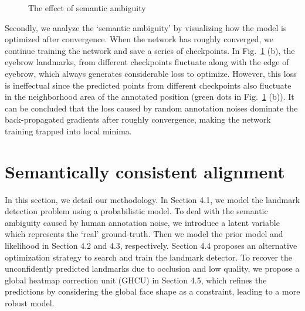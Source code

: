 \documentclass[10pt,twocolumn,letterpaper]{article}
\begin{document}
\begin{figure}
	\centering
	\caption{{The effect of semantic ambiguity}}
	\label{fig:analysis}
\end{figure}
{Secondly, we analyze the `semantic ambiguity' by visualizing how the model is optimized after convergence. When the network has roughly converged, we continue training the network and save a series of checkpoints. 
	In Fig.~\ref{fig:analysis} (b), the eyebrow landmarks, from different checkpoints fluctuate along with the 
	edge of eyebrow, which always generates considerable loss to optimize. However, this loss is ineffectual 
	since the predicted points from different checkpoints also fluctuate 
in the neighborhood area of 
the annotated position 
	(green dots in Fig.~\ref{fig:analysis} (b)). It can be concluded that the loss caused by random 
	annotation noises dominate the back-propagated gradients after roughly convergence, making the network 
	training trapped into local minima.}



\section{Semantically consistent alignment}
In this section, we detail our methodology. 
In Section 4.1, we model the landmark detection problem using a probabilistic model. 
To deal with the semantic ambiguity caused by human annotation noise, we introduce a latent variable  which represents the `real' ground-truth. Then we model the prior model and likelihood in Section 4.2 and 4.3, respectively.  Section 4.4  proposes an alternative optimization strategy to search  and train the landmark detector. To recover the unconfidently predicted landmarks due 
to occlusion and low quality, we propose a global heatmap correction unit (GHCU) in Section 4.5, 
which refines the predictions by considering the global face shape as a constraint, leading to a more robust model.
\end{document}
